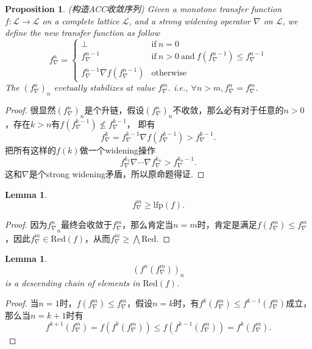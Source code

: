 \documentclass{article}
\newtheorem{lemma}[theorem]{Lemma}
\newtheorem{proposition}[theorem]{Proposition}
\newcommand*{\xfunc}[4]{{#2}\colon{#3}{#1}{#4}}
\newcommand*{\func}[3]{\xfunc{\to}{#1}{#2}{#3}}
\begin{document}
\begin{proposition}
\rm {\color{red}(构造ACC收敛序列)} Given a monotone transfer function $\func{f}{\mathcal{L}}{\mathcal{L}}$ on a complete lattice $\mathcal{L}$, and a strong widening operator $\nabla$ on $\mathcal{L}$, we define the new transfer function as follow
$$
f^n_\nabla = \left\{ \begin{array}{ll} \perp & \text{if}~n=0 \\ 
f^{n-1}_\nabla & \text{if}~n > 0~\text{and}~f(f^{n-1}_\nabla) \leq f^{n-1}_\nabla \\
f^{n-1}_\nabla \nabla f(f^{n-1}_\nabla) & \text{otherwise}
\end{array} \right.
$$
The $(f^n_\nabla)_n$ evetually stabilizes at value $f^m_\nabla$. i.e., $\forall n > m, f^n_\nabla = f^m_\nabla$.

\color{blue}  
\end{proposition}

\begin{proof}
很显然$(f^n_\nabla)_n$是个升链，假设$(f^n_\nabla)_n$不收敛，那么必有对于任意的$n > 0$，存在$k > n$有$f(f^{k-1}_\nabla) \nleq f^{k-1}_\nabla$， 即有
$$
f^k_\nabla=f^{k-1}_\nabla \nabla f(f^{k-1}_\nabla) > f^{k-1}_\nabla.
$$
把所有这样的$f(k)$做一个widening操作
$$
f^{k_1}_\nabla \nabla \cdots \nabla f^{k_n}_\nabla > f^{k_n-1}_\nabla.
$$
这和$\nabla$是个strong widening矛盾，所以原命题得证.
\end{proof}

\begin{lemma}\rm
$$
f^m_\nabla \geq \text{lfp}(f). 
$$
\end{lemma}

\begin{proof}
因为${f^n_\nabla}_n$最终会收敛于$f^m_\nabla$，那么肯定当$n=m$时，肯定是满足$f(f^m_\nabla) \leq f^m_\nabla$，因此$f^m_\nabla \in \text{Red}(f)$，从而$f^m_\nabla \geq \bigwedge \text{Red}$. 
\end{proof}

\begin{lemma}\rm
$$
(f^n(f^m_\nabla))_n
$$
is a descending chain of elements in $\text{Red}(f)$.
\end{lemma}

\begin{proof}
当$n=1$时，$f(f^m_\nabla) \leq f^m_\nabla$，假设$n=k$时，有$f^k(f^m_\nabla) \leq f^{k-1}(f^m_\nabla)$成立，那么当$n= k+1$时有
$$
f^{k+1}(f^m_\nabla)= f(f^k(f^m_\nabla)) \leq f(f^{k-1}(f^m_\nabla)) = f^k(f^m_\nabla).
$$
\end{proof}
\end{document}
